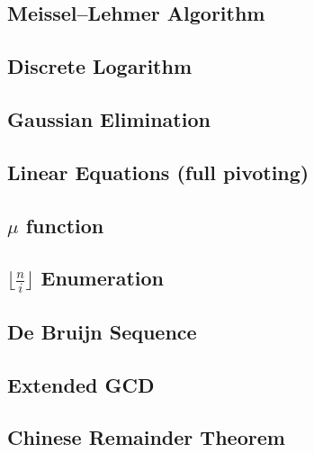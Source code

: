 \documentclass[a4paper,10pt,twocolumn,oneside]{article}
\begin{document}
\subsection{Meissel–Lehmer Algorithm}

\subsection{Discrete Logarithm}

\subsection{Gaussian Elimination}

\subsection{Linear Equations (full pivoting)}

\subsection{$\mu$ function}

\subsection{$\lfloor \frac{n}{i} \rfloor$ Enumeration}

\subsection{De Bruijn Sequence}

\subsection{Extended GCD}

\subsection{Chinese Remainder Theorem}

% 
% 
% 
\end{document}
